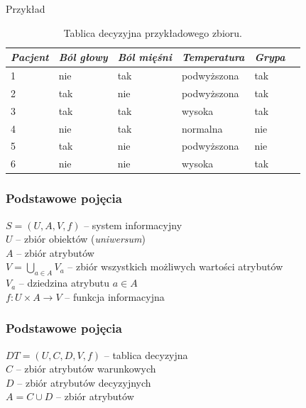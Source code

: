 \documentclass[10pt]{beamer}
\begin{document}
\begin{frame}{Przykład}
\begin{center}
\begin{table}
\begin{tabular}{|k{1.2cm}|k{1.8cm}|k{1.8cm}|k{2.2cm}|k{1.4cm}|@{}m{0pt}@{}}
\hline
\textit{Pacjent} & \textit{Ból głowy} & \textit{Ból mięśni} & \textit{Temperatura} &  \textit{Grypa} &\\[1ex]
 & nie & tak & podwyższona & tak &\\[1ex]
2 & tak & nie & podwyższona & tak &\\[1ex]
3 & tak & tak & wysoka & tak &\\[1ex]
4 & nie & tak & normalna & nie &\\[1ex]
5 & tak & nie & podwyższona & nie &\\[1ex]
6 & nie & nie & wysoka & tak &\\[1ex]
\hline
\end{tabular}
\caption{Tablica decyzyjna przykładowego zbioru.}
\end{table}
\end{center}
\end{frame}




\begin{frame}
\frametitle{Podstawowe pojęcia}
\begin{spacing}{1.7}
\begin{flushleft}
$S = (U, A, V, f)$ -- system informacyjny\\
$U$ -- zbiór obiektów (\textit{uniwersum})\\
$A$ -- zbiór atrybutów\\
$V = \bigcup\limits_{a \in A} V_{a}$ -- zbiór wszystkich możliwych wartości atrybutów\\
$V_{a}$ -- dziedzina atrybutu $a \in A$\\
$f : U \times A \rightarrow V$ -- funkcja informacyjna\\
\end{flushleft}
\end{spacing}
\end{frame}


\begin{frame}
\frametitle{Podstawowe pojęcia}
\begin{spacing}{1.7}
\begin{flushleft}
$DT = (U, C, D, V, f)$ -- tablica decyzyjna\\
$C$ -- zbiór atrybutów warunkowych\\
$D$ -- zbiór atrybutów decyzyjnych\\
$A = C \cup D$ -- zbiór atrybutów\\
\end{flushleft}
\end{spacing}
\end{frame}
\end{document}
